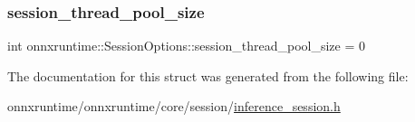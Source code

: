 \subsubsection{\texorpdfstring{session\+\_\+thread\+\_\+pool\+\_\+size}{session\_thread\_pool\_size}}
{\footnotesize\ttfamily int onnxruntime\+::\+Session\+Options\+::session\+\_\+thread\+\_\+pool\+\_\+size = 0}



The documentation for this struct was generated from the following file\+:\begin{DoxyCompactItemize}
\item 
onnxruntime/onnxruntime/core/session/\mbox{\hyperlink{inference__session_8h}{inference\+\_\+session.\+h}}\end{DoxyCompactItemize}
